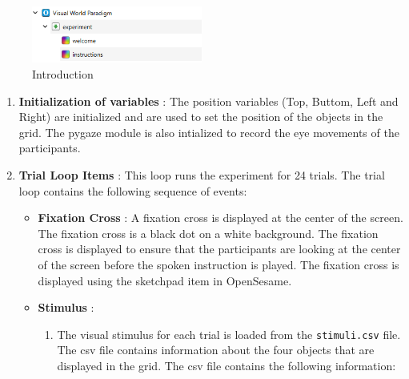\documentclass[
  a4paper,
]{article}
\providecommand{\tightlist}{%
  \setlength{\itemsep}{0pt}\setlength{\parskip}{0pt}}\usepackage{longtable,booktabs,array}
\begin{document}
\begin{figure}

{\centering \includegraphics[width=0.5\textwidth,height=\textheight]{img/intro_script.png}

}

\caption{\label{fig-ui}Introduction}

\end{figure}

\begin{enumerate}
\def\labelenumi{\arabic{enumi}.}
\setcounter{enumi}{1}
\item
  \textbf{Initialization of variables} : The position variables (Top,
  Buttom, Left and Right) are initialized and are used to set the
  position of the objects in the grid. The pygaze module is also
  intialized to record the eye movements of the participants.
\item
  \textbf{Trial Loop Items} : This loop runs the experiment for 24
  trials. The trial loop contains the following sequence of events:

  \begin{itemize}
  \item
    \textbf{Fixation Cross} : A fixation cross is displayed at the
    center of the screen. The fixation cross is a black dot on a white
    background. The fixation cross is displayed to ensure that the
    participants are looking at the center of the screen before the
    spoken instruction is played. The fixation cross is displayed using
    the sketchpad item in OpenSesame.
  \item
    \textbf{Stimulus} :

    \begin{enumerate}
    \def\labelenumii{\arabic{enumii}.}
    \tightlist
    \item
      The visual stimulus for each trial is loaded from the
      \texttt{stimuli.csv} file. The csv file contains information about
      the four objects that are displayed in the grid. The csv file
      contains the following information:


\end{enumerate}
\end{itemize}
\end{enumerate}
\end{document}
